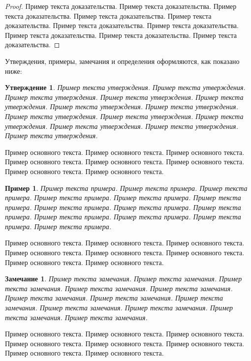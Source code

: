 \documentclass[pdflatex,sn-mathphys-gost]{pmi-jnl}
\newtheorem{proposition}[theorem]{Утверждение}%
\newtheorem{example}{Пример}%
\newtheorem{remark}{Замечание}%
\begin{document}
\begin{proof}
Пример текста доказательства. Пример текста доказательства. Пример текста доказательства. Пример текста доказательства. Пример текста доказательства. Пример текста доказательства. Пример текста доказательства. Пример текста доказательства. Пример текста доказательства. Пример текста доказательства. 
\end{proof}

Утверждения, примеры, замечания и определения оформляются, как показано ниже:

\begin{proposition}
Пример текста утверждения. Пример текста утверждения. Пример текста утверждения. Пример текста утверждения. Пример текста утверждения. Пример текста утверждения. Пример текста утверждения. Пример текста утверждения. Пример текста утверждения. Пример текста утверждения. Пример текста утверждения. Пример текста утверждения. Пример текста утверждения. 
\end{proposition}

Пример основного текста. Пример основного текста. Пример основного текста. Пример основного текста. Пример основного текста. Пример основного текста. Пример основного текста. Пример основного текста.

\begin{example}
Пример текста примера. Пример текста примера. Пример текста примера. Пример текста примера. Пример текста примера. Пример текста примера. Пример текста примера. Пример текста примера. Пример текста примера. Пример текста примера. Пример текста примера. Пример текста примера. Пример текста примера. 
\end{example}

Пример основного текста. Пример основного текста. Пример основного текста. Пример основного текста. Пример основного текста. Пример основного текста. Пример основного текста. Пример основного текста.

\begin{remark}
Пример текста замечания. Пример текста замечания. Пример текста замечания. Пример текста замечания. Пример текста замечания. Пример текста замечания. Пример текста замечания. Пример текста замечания. Пример текста замечания. Пример текста замечания. Пример текста замечания. Пример текста замечания. 
\end{remark}

Пример основного текста. Пример основного текста. Пример основного текста. Пример основного текста. Пример основного текста. Пример основного текста. Пример основного текста. Пример основного текста.
\end{document}
